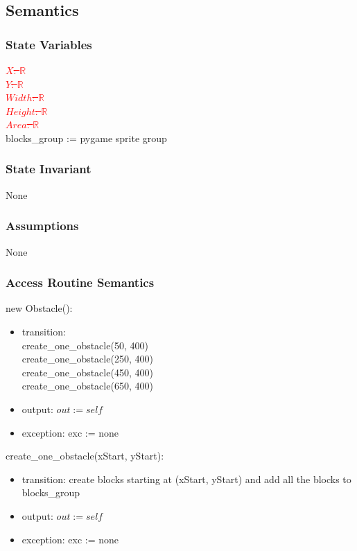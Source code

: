 \documentclass[12pt]{article}
\begin{document}
\subsection*{Semantics}
\subsubsection*{State Variables}
\textcolor{red}{\st{$\mathit{X}$: $\mathbb{R}$}}\\
\textcolor{red}{\st{$\mathit{Y}$: $\mathbb{R}$}}\\
\textcolor{red}{\st{$\mathit{Width}$: $\mathbb{R}$}}\\
\textcolor{red}{\st{$\mathit{Height}$: $\mathbb{R}$}}\\
\textcolor{red}{\st{$\mathit{Area}$: $\mathbb{R}$}}\\
blocks\_group := pygame sprite group
\subsubsection*{State Invariant}
None
\subsubsection*{Assumptions}
None
\subsubsection*{Access Routine Semantics}
\noindent new Obstacle():
\begin{itemize}
\item transition: \\
create\_one\_obstacle(50, 400)\\
create\_one\_obstacle(250, 400)\\
create\_one\_obstacle(450, 400)\\
create\_one\_obstacle(650, 400)
\item output: $out := \mathit{self}$
\item exception: exc := none
\end{itemize}

\noindent create\_one\_obstacle(xStart, yStart):
\begin{itemize}
\item transition: create blocks starting at (xStart, yStart) and add all
the blocks to blocks\_group
\item output: $out := \mathit{self}$
\item exception: exc := none
\end{itemize}
\end{document}
